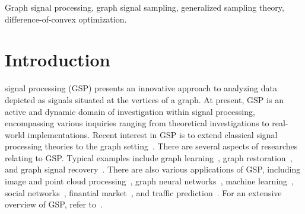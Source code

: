 \documentclass[journal]{IEEEtran}
\begin{document}
\begin{IEEEkeywords}
    Graph signal processing, graph signal sampling, generalized sampling theory, difference-of-convex optimization.
\end{IEEEkeywords}

\IEEEpeerreviewmaketitle

\section{Introduction}
 signal processing (GSP) presents an innovative approach to analyzing data depicted as signals situated at the vertices of a graph.
At present, GSP is an active and dynamic domain of investigation within signal processing, encompassing various inquiries ranging from theoretical investigations to real-world implementations.
Recent interest in GSP is to extend classical signal processing theories to the graph setting~\cite{narang2012perfect,agaskar2013spectral,sandryhaila2014big,shuman2015multiscale,tanaka2020gensamp}.
There are several aspects of researches relating to GSP. 
Typical examples include graph learning~\cite{dong2016learning,egilmez2018graph,liu2019graph,dong2019learning}, graph restoration~\cite{ono2015total,onuki2016graph,nagahama2022graph}, and graph signal recovery~\cite{berger2017graph,yamagata2025robust}.
There are also various applications of GSP, including image and point cloud processing~\cite{cheung2018graph,wang2019dynamic,zare2020fusing,takemoto2022graph}, graph neural networks~\cite{bronstein2017geometric}, machine learning~\cite{chen2014semi,gadde2014active}, social networks~\cite{perozzi2014deepwalk}, finantial market~\cite{saboksayr2021learning}, and traffic prediction~\cite{hasanzadeh2019piecewise}.
For an extensive overview of GSP, refer to~\cite{shuman2013emerging,sandryhaila2013discrete,ortega2018graph}.
\end{document}
